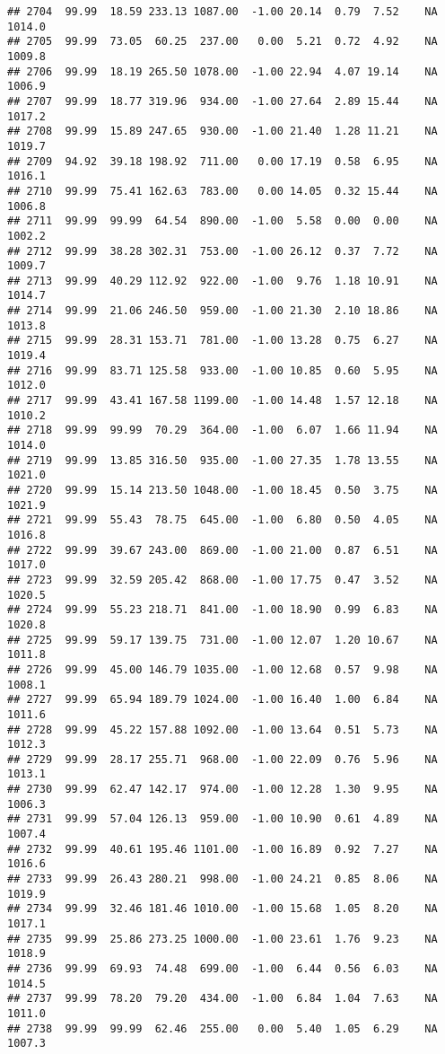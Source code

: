 \documentclass{article}\usepackage{graphicx, color}
\makeatletter
\newenvironment{kframe}{%
 \def\at@end@of@kframe{}%
 \ifinner\ifhmode%
  \def\at@end@of@kframe{\end{minipage}}%
  \begin{minipage}{\columnwidth}%
 \fi\fi%
 \def\FrameCommand##1{\hskip\@totalleftmargin \hskip-\fboxsep
 \colorbox{shadecolor}{##1}\hskip-\fboxsep
     \hskip-\linewidth \hskip-\@totalleftmargin \hskip\columnwidth}%
 \MakeFramed {\advance\hsize-\width
   \@totalleftmargin\z@ \linewidth\hsize
   \@setminipage}}%
 {\par\unskip\endMakeFramed%
 \at@end@of@kframe}
\newenvironment{knitrout}{}{} %
\makeatother
\begin{document}
\begin{knitrout}
\begin{kframe}
\begin{verbatim}
## 2704  99.99  18.59 233.13 1087.00  -1.00 20.14  0.79  7.52    NA 1014.0
## 2705  99.99  73.05  60.25  237.00   0.00  5.21  0.72  4.92    NA 1009.8
## 2706  99.99  18.19 265.50 1078.00  -1.00 22.94  4.07 19.14    NA 1006.9
## 2707  99.99  18.77 319.96  934.00  -1.00 27.64  2.89 15.44    NA 1017.2
## 2708  99.99  15.89 247.65  930.00  -1.00 21.40  1.28 11.21    NA 1019.7
## 2709  94.92  39.18 198.92  711.00   0.00 17.19  0.58  6.95    NA 1016.1
## 2710  99.99  75.41 162.63  783.00   0.00 14.05  0.32 15.44    NA 1006.8
## 2711  99.99  99.99  64.54  890.00  -1.00  5.58  0.00  0.00    NA 1002.2
## 2712  99.99  38.28 302.31  753.00  -1.00 26.12  0.37  7.72    NA 1009.7
## 2713  99.99  40.29 112.92  922.00  -1.00  9.76  1.18 10.91    NA 1014.7
## 2714  99.99  21.06 246.50  959.00  -1.00 21.30  2.10 18.86    NA 1013.8
## 2715  99.99  28.31 153.71  781.00  -1.00 13.28  0.75  6.27    NA 1019.4
## 2716  99.99  83.71 125.58  933.00  -1.00 10.85  0.60  5.95    NA 1012.0
## 2717  99.99  43.41 167.58 1199.00  -1.00 14.48  1.57 12.18    NA 1010.2
## 2718  99.99  99.99  70.29  364.00  -1.00  6.07  1.66 11.94    NA 1014.0
## 2719  99.99  13.85 316.50  935.00  -1.00 27.35  1.78 13.55    NA 1021.0
## 2720  99.99  15.14 213.50 1048.00  -1.00 18.45  0.50  3.75    NA 1021.9
## 2721  99.99  55.43  78.75  645.00  -1.00  6.80  0.50  4.05    NA 1016.8
## 2722  99.99  39.67 243.00  869.00  -1.00 21.00  0.87  6.51    NA 1017.0
## 2723  99.99  32.59 205.42  868.00  -1.00 17.75  0.47  3.52    NA 1020.5
## 2724  99.99  55.23 218.71  841.00  -1.00 18.90  0.99  6.83    NA 1020.8
## 2725  99.99  59.17 139.75  731.00  -1.00 12.07  1.20 10.67    NA 1011.8
## 2726  99.99  45.00 146.79 1035.00  -1.00 12.68  0.57  9.98    NA 1008.1
## 2727  99.99  65.94 189.79 1024.00  -1.00 16.40  1.00  6.84    NA 1011.6
## 2728  99.99  45.22 157.88 1092.00  -1.00 13.64  0.51  5.73    NA 1012.3
## 2729  99.99  28.17 255.71  968.00  -1.00 22.09  0.76  5.96    NA 1013.1
## 2730  99.99  62.47 142.17  974.00  -1.00 12.28  1.30  9.95    NA 1006.3
## 2731  99.99  57.04 126.13  959.00  -1.00 10.90  0.61  4.89    NA 1007.4
## 2732  99.99  40.61 195.46 1101.00  -1.00 16.89  0.92  7.27    NA 1016.6
## 2733  99.99  26.43 280.21  998.00  -1.00 24.21  0.85  8.06    NA 1019.9
## 2734  99.99  32.46 181.46 1010.00  -1.00 15.68  1.05  8.20    NA 1017.1
## 2735  99.99  25.86 273.25 1000.00  -1.00 23.61  1.76  9.23    NA 1018.9
## 2736  99.99  69.93  74.48  699.00  -1.00  6.44  0.56  6.03    NA 1014.5
## 2737  99.99  78.20  79.20  434.00  -1.00  6.84  1.04  7.63    NA 1011.0
## 2738  99.99  99.99  62.46  255.00   0.00  5.40  1.05  6.29    NA 1007.3

\end{verbatim}
\end{kframe}
\end{knitrout}
\end{document}
